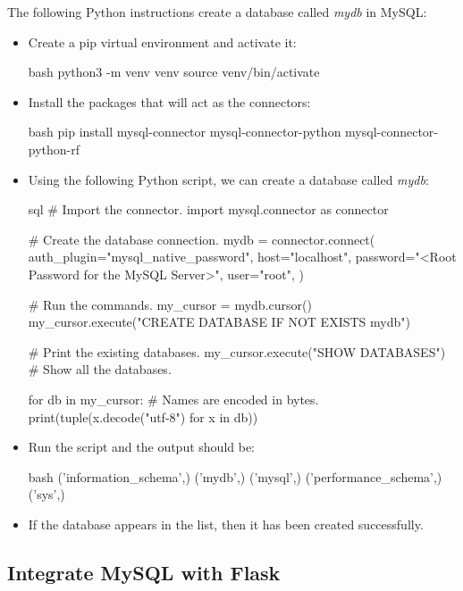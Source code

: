 The following Python instructions create a database called \textit{mydb} in MySQL:
\begin{itemize}
    \item Create a pip virtual environment and activate it:
    \begin{mintedbox}{bash}
python3 -m venv venv
source venv/bin/activate
    \end{mintedbox}
    \item Install the packages that will act as the connectors:
    \begin{mintedbox}{bash}
pip install mysql-connector mysql-connector-python mysql-connector-python-rf
    \end{mintedbox}
    \item Using the following Python script, we can create a database called \textit{mydb}:
    \begin{mintedbox}{sql}
# Import the connector.
import mysql.connector as connector

# Create the database connection.
mydb = connector.connect(
    auth_plugin="mysql_native_password",
    host="localhost",
    password="<Root Password for the MySQL Server>",
    user="root",
)

# Run the commands.
my_cursor = mydb.cursor()
my_cursor.execute("CREATE DATABASE IF NOT EXISTS mydb")

# Print the existing databases.
my_cursor.execute("SHOW DATABASES")  # Show all the databases.

for db in my_cursor:
    # Names are encoded in bytes.
    print(tuple(x.decode("utf-8") for x in  db))
    \end{mintedbox}
    \item Run the script and the output should be:
    \begin{mintedbox}{bash}
('information_schema',)
('mydb',)
('mysql',)
('performance_schema',)
('sys',)
    \end{mintedbox}
    \item If the database appears in the list, then it has been created successfully.
\end{itemize}

\subsection{Integrate MySQL with Flask}


